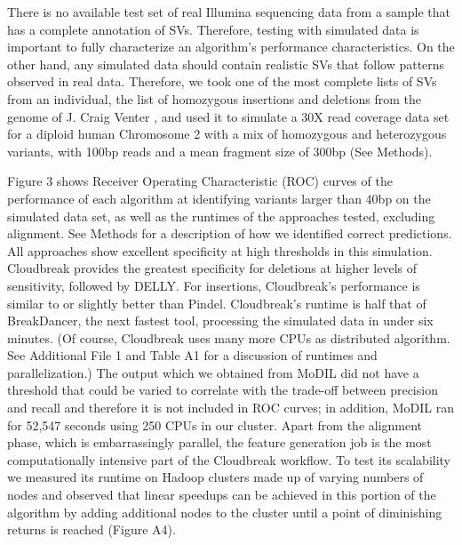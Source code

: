 \documentclass[10pt]{bmc_article}
\newenvironment{bmcformat}{\fussy\setboolean{publ}{true}}{\fussy}
\begin{document}
\begin{bmcformat}
There is no available test set of real Illumina sequencing data from a sample that has a complete annotation of SVs. Therefore, testing with simulated data is important to fully characterize an algorithm's performance characteristics. On the other hand, any simulated data should contain realistic SVs that follow patterns observed in real data. Therefore, we took one of the most complete lists of SVs from an individual, the list of homozygous insertions and deletions from the genome of J. Craig Venter \cite{Levy:2007fb}, and used it to simulate a 30X read coverage data set for a diploid human Chromosome 2 with a mix of homozygous and heterozygous variants, with 100bp reads and a mean fragment size of 300bp (See Methods).

Figure 3 shows Receiver Operating Characteristic (ROC) curves of the performance of each algorithm at identifying variants larger than 40bp on the simulated data set, as well as the runtimes of the approaches tested, excluding alignment. See Methods for a description of how we identified correct predictions. All approaches show excellent specificity at high thresholds in this simulation. Cloudbreak provides the greatest specificity for deletions at higher levels of sensitivity, followed by DELLY. For insertions, Cloudbreak's performance is similar to or slightly better than Pindel. Cloudbreak's runtime is half that of BreakDancer, the next fastest tool, processing the simulated data in under six minutes. (Of course, Cloudbreak uses many more CPUs as distributed algorithm. See Additional File 1 and Table A1 for a discussion of runtimes and parallelization.) The output which we obtained from MoDIL did not have a threshold that could be varied to correlate with the trade-off between precision and recall and therefore it is not included in ROC curves; in addition, MoDIL ran for 52,547 seconds using 250 CPUs in our cluster. Apart from the alignment phase, which is embarrassingly parallel, the feature generation job is the most computationally intensive part of the Cloudbreak workflow. To test its scalability we measured its runtime on Hadoop clusters made up of varying numbers of nodes and observed that linear speedups can be achieved in this portion of the algorithm by adding additional nodes to the cluster until a point of diminishing returns is reached (Figure A4).


\end{bmcformat}
\end{document}
